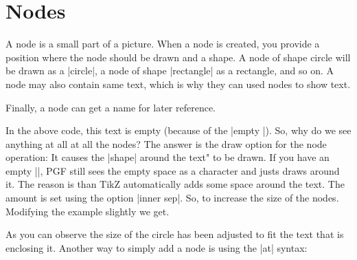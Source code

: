 \section{Nodes}

A node is a small part of a picture. When a node is created, you provide a position where the node
should be drawn and a shape. A node of shape circle will be drawn as a |circle|, a node of shape |rectangle|
as a rectangle, and so on. A node may also contain same text, which is why they can used nodes to show text.

Finally, a node can get a name for later reference.



\begin{teXXX}
\end{teXXX}
\medskip


In the above code, this text is empty (because of the
|empty {}|). So, why do we see anything at all at all the nodes? The answer is the draw option for the node operation: It
causes the |shape| around the text" to be drawn. If you have an empty |{}|, PGF still sees the empty space as a character and justs draws around it. The reason is than TikZ automatically adds some space around the text. The amount is set
using the option |inner sep|. So, to increase the size of the nodes. Modifying the example slightly we get.




As you can observe the size of the circle has been adjusted to fit the text that is enclosing it. 
Another way to simply add a node is using the |at| syntax:

